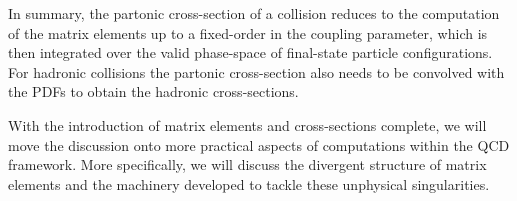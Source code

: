 \documentclass[main.tex]{subfiles}
\begin{document}
    In summary, the partonic cross-section of a collision
    reduces to the computation of the matrix elements
    up to a fixed-order in the coupling parameter,
    which is then integrated over the valid phase-space of
    final-state particle configurations. For hadronic
    collisions the partonic cross-section also needs to
    be convolved with the PDFs to obtain the hadronic
    cross-sections.

    With the introduction of matrix elements and
    cross-sections complete, we will move the discussion onto
    more practical aspects of computations within the
    QCD framework. More specifically, we will discuss
    the divergent structure of matrix elements
    and the machinery developed to tackle these
    unphysical singularities.
\end{document}
